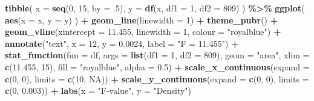 \documentclass[
]{book}
\newenvironment{Shaded}{\begin{snugshade}}{\end{snugshade}}
\newcommand{\AttributeTok}[1]{\textcolor[rgb]{0.13,0.29,0.53}{#1}}
\newcommand{\ConstantTok}[1]{\textcolor[rgb]{0.56,0.35,0.01}{#1}}
\newcommand{\DecValTok}[1]{\textcolor[rgb]{0.00,0.00,0.81}{#1}}
\newcommand{\FloatTok}[1]{\textcolor[rgb]{0.00,0.00,0.81}{#1}}
\newcommand{\FunctionTok}[1]{\textcolor[rgb]{0.13,0.29,0.53}{\textbf{#1}}}
\newcommand{\NormalTok}[1]{#1}
\newcommand{\SpecialCharTok}[1]{\textcolor[rgb]{0.81,0.36,0.00}{\textbf{#1}}}
\newcommand{\StringTok}[1]{\textcolor[rgb]{0.31,0.60,0.02}{#1}}
\begin{document}
\begin{Shaded}
\begin{Highlighting}[]
\FunctionTok{tibble}\NormalTok{(}
  \AttributeTok{x =} \FunctionTok{seq}\NormalTok{(}\DecValTok{0}\NormalTok{, }\DecValTok{15}\NormalTok{, }\AttributeTok{by =}\NormalTok{ .}\DecValTok{5}\NormalTok{),}
  \AttributeTok{y =} \FunctionTok{df}\NormalTok{(x, }\AttributeTok{df1 =} \DecValTok{1}\NormalTok{, }\AttributeTok{df2 =} \DecValTok{809}\NormalTok{)}
\NormalTok{) }\SpecialCharTok{\%\textgreater{}\%}
  \FunctionTok{ggplot}\NormalTok{(}
    \FunctionTok{aes}\NormalTok{(}\AttributeTok{x =}\NormalTok{ x, }\AttributeTok{y =}\NormalTok{ y)}
\NormalTok{  ) }\SpecialCharTok{+}
  \FunctionTok{geom\_line}\NormalTok{(}\AttributeTok{linewidth =} \DecValTok{1}\NormalTok{) }\SpecialCharTok{+}
  \FunctionTok{theme\_pubr}\NormalTok{() }\SpecialCharTok{+}
  \FunctionTok{geom\_vline}\NormalTok{(}\AttributeTok{xintercept =} \FloatTok{11.455}\NormalTok{, }\AttributeTok{linewidth =} \DecValTok{1}\NormalTok{, }\AttributeTok{colour =} \StringTok{"royalblue"}\NormalTok{) }\SpecialCharTok{+}
  \FunctionTok{annotate}\NormalTok{(}\StringTok{"text"}\NormalTok{, }\AttributeTok{x =} \DecValTok{12}\NormalTok{, }\AttributeTok{y =} \FloatTok{0.0024}\NormalTok{, }\AttributeTok{label =} \StringTok{"F = 11.455"}\NormalTok{) }\SpecialCharTok{+}
  \FunctionTok{stat\_function}\NormalTok{(}\AttributeTok{fun =}\NormalTok{ df, }\AttributeTok{args =} \FunctionTok{list}\NormalTok{(}\AttributeTok{df1 =} \DecValTok{1}\NormalTok{, }\AttributeTok{df2 =} \DecValTok{809}\NormalTok{), }
                \AttributeTok{geom =} \StringTok{"area"}\NormalTok{, }\AttributeTok{xlim =} \FunctionTok{c}\NormalTok{(}\FloatTok{11.455}\NormalTok{, }\DecValTok{15}\NormalTok{),}
                \AttributeTok{fill =} \StringTok{"royalblue"}\NormalTok{, }\AttributeTok{alpha =} \FloatTok{0.5}\NormalTok{) }\SpecialCharTok{+} 
  \FunctionTok{scale\_x\_continuous}\NormalTok{(}\AttributeTok{expand =} \FunctionTok{c}\NormalTok{(}\DecValTok{0}\NormalTok{, }\DecValTok{0}\NormalTok{), }\AttributeTok{limits =} \FunctionTok{c}\NormalTok{(}\DecValTok{10}\NormalTok{, }\ConstantTok{NA}\NormalTok{)) }\SpecialCharTok{+} 
  \FunctionTok{scale\_y\_continuous}\NormalTok{(}\AttributeTok{expand =} \FunctionTok{c}\NormalTok{(}\DecValTok{0}\NormalTok{, }\DecValTok{0}\NormalTok{), }\AttributeTok{limits =} \FunctionTok{c}\NormalTok{(}\DecValTok{0}\NormalTok{, }\FloatTok{0.003}\NormalTok{)) }\SpecialCharTok{+}
  \FunctionTok{labs}\NormalTok{(}\AttributeTok{x =} \StringTok{"F{-}value"}\NormalTok{, }\AttributeTok{y =} \StringTok{"Density"}\NormalTok{)}
\end{Highlighting}
\end{Shaded}
\end{document}
